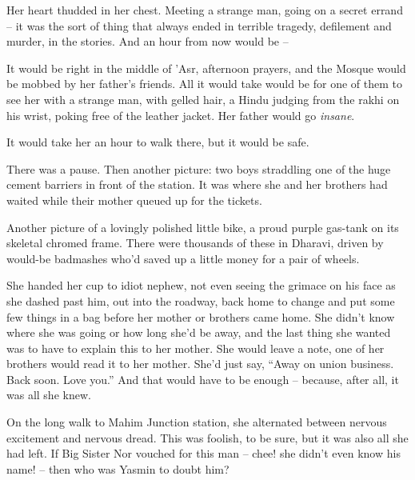
Her heart thudded in her chest. Meeting a strange man, going on a
secret errand -- it was the sort of thing that always ended in
terrible tragedy, defilement and murder, in the stories. And an
hour from now would be --


It would be right in the middle of 'Asr, afternoon prayers, and the
Mosque would be mobbed by her father's friends. All it would take
would be for one of them to see her with a strange man, with gelled
hair, a Hindu judging from the rakhi on his wrist, poking free of
the leather jacket. Her father would go \emph{insane}.


It would take her an hour to walk there, but it would be safe.

There was a pause. Then another picture: two boys straddling one of
the huge cement barriers in front of the station. It was where she
and her brothers had waited while their mother queued up for the
tickets.




Another picture of a lovingly polished little bike, a proud purple
gas-tank on its skeletal chromed frame. There were thousands of
these in Dharavi, driven by would-be badmashes who'd saved up a
little money for a pair of wheels.


She handed her cup to idiot nephew, not even seeing the grimace on
his face as she dashed past him, out into the roadway, back home to
change and put some few things in a bag before her mother or
brothers came home. She didn't know where she was going or how long
she'd be away, and the last thing she wanted was to have to explain
this to her mother. She would leave a note, one of her brothers
would read it to her mother. She'd just say, ``Away on union
business. Back soon. Love you.'' And that would have to be enough --
because, after all, it was all she knew.

On the long walk to Mahim Junction station, she alternated between
nervous excitement and nervous dread. This was foolish, to be sure,
but it was also all she had left. If Big Sister Nor vouched for
this man -- chee! she didn't even know his name! -- then who was
Yasmin to doubt him?

